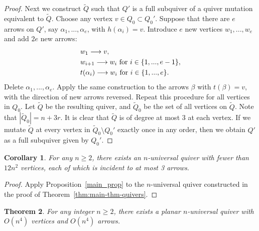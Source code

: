 \documentclass[10pt]{amsart}
\newtheorem{theorem}{Theorem}[section]
\newtheorem{corollary}[theorem]{Corollary}
\theoremstyle{definition}
\begin{document}
\begin{proof}
Next we construct $\widetilde{Q}$ such that $Q'$ is a full subquiver of a quiver mutation equivalent to $\widetilde{Q}$.
Choose any vertex $v\in Q_0\subset Q_0'$. Suppose that there are $e$ arrows on $Q'$, say $\alpha_1,...,\alpha_e$, with $h(\alpha_i)=v$. Introduce $e$ new vertices $w_1,...,w_e$ and add $2e$ new arrows:
$$\aligned
&w_1\longrightarrow v,\\
&w_{i+1}\longrightarrow w_i\text{ for }i\in\{1,...,e-1\},\\
&t(\alpha_i)\longrightarrow w_i\text{ for }i\in\{1,...,e\}.
\endaligned$$ 
Delete $\alpha_1,...,\alpha_e$. Apply the same construction to the arrows $\beta$ with $t(\beta)=v$, with the direction of new arrows reversed. Repeat this procedure for all vertices in $Q_0$. Let $\widetilde{Q}$ be the resulting quiver, and $\widetilde{Q}_0$ be the set of all vertices on $\widetilde{Q}$. Note that $|\widetilde{Q}_0|=n+3r$. It is clear that $\widetilde{Q}$ is of degree at most 3 at each vertex. If we mutate $\widetilde{Q}$ at every vertex in $ \widetilde{Q}_0\setminus Q_0'$ exactly once in any order, then we obtain $Q'$ as a full subquiver given by $Q_0'$.
\fi
\end{proof}

\begin{corollary}
\label{main_thm2}
For any $n\ge 2$, there exists an $n$-universal quiver with fewer than $12n^2$ vertices, each of which is incident to at most 3 arrows. 
\end{corollary}

\begin{proof}
Apply Proposition~\ref{main_prop} to the $n$-universal quiver constructed in the proof of Theorem~\ref{thm:main-thm-quivers}.
\end{proof}

\begin{theorem}
\label{thm:planar-universal}
For any integer $n\ge 2$, there exists a planar $n$-universal quiver with $O(n^4)$ vertices and $O(n^4)$ arrows. 
\end{theorem}
\end{document}
